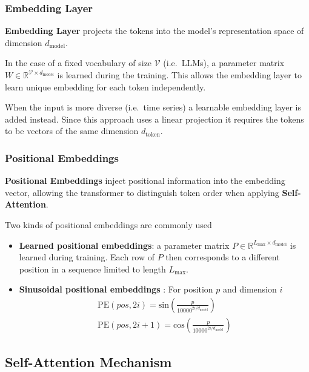 \subsubsection{Embedding Layer}

\textbf{Embedding Layer} projects the tokens into the model's representation space of dimension $d_{\mathrm{model}}$.

In the case of a fixed vocabulary of size $\mathcal{V}$ (i.e.\ LLMs), a parameter matrix $W \in \mathbb{R}^{\mathcal{V} \times d_{\mathrm{model}}}$ is learned during the training.
This allows the embedding layer to learn unique embedding for each token independently.

When the input is more diverse (i.e.\ time series) a learnable embedding layer is added instead.
Since this approach uses a linear projection it requires the tokens to be vectors of the same dimension $d_{\mathrm{token}}$.

\subsubsection{Positional Embeddings}

\textbf{Positional Embeddings} inject positional information into the embedding vector, allowing the transformer to distinguish token order when applying \textbf{Self-Attention}.

Two kinds of positional embeddings are commonly used

\begin{itemize}
    \item \textbf{Learned positional embeddings}: a parameter matrix $P \in \mathbb{R}^{L_{\mathrm{max}} \times d_{\mathrm{model}}}$ is learned during training.
    Each row of $P$ then corresponds to a different position in a sequence limited to length $L_{\mathrm{max}}$.
    \item \textbf{Sinusoidal positional embeddings} \parencite{AttentionIsAllYouNeed}: For position $p$ and dimension $i$
    {\setlength{\jot}{1em}
    \begin{align}
        \mathrm{PE}(pos, 2i) = \mathrm{sin} \left(\frac{p}{10000^{2i / d_{\mathrm{model}}}}\right) \\
        \mathrm{PE}(pos, 2i + 1) = \mathrm{cos} \left(\frac{p}{10000^{2i / d_{\mathrm{model}}}}\right)
    \end{align}
    }
\end{itemize}

\subsection{Self-Attention Mechanism}

